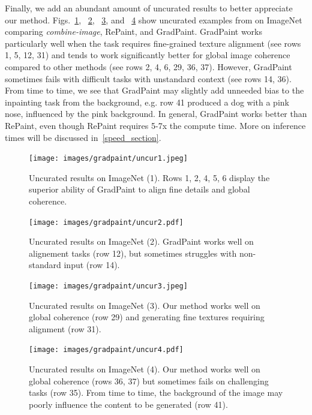 Finally, we add an abundant amount of uncurated results to better appreciate our method.
Figs.~\ref{fig:uncur1}, ~\ref{fig:uncur2}, ~\ref{fig:uncur3}, and ~\ref{fig:uncur4} show uncurated 
examples from on ImageNet comparing \emph{combine-image}, RePaint, and GradPaint. GradPaint works particularly well when the 
task requires fine-grained texture alignment (see rows 1, 5, 12, 31)  and tends to work significantly better for global image 
coherence compared to other methods (see rows 2, 4, 6, 29, 36, 37). However, GradPaint sometimes fails with difficult tasks with 
unstandard context (see rows 14, 36). From time to time, we see that GradPaint may slightly add unneeded bias to the inpainting 
task from the background, e.g. row 41 produced a dog with a pink nose, influenced by the pink background. In general, GradPaint 
works better than RePaint, even though RePaint requires 5-7x the compute time. More on inference times will be discussed  
in~\ref{speed_section}.


\begin{figure}[H]
  \centering
    \texttt{[image: images/gradpaint/uncur1.jpeg]}
    \caption{Uncurated results on ImageNet (1). Rows 1, 2, 4, 5, 6 display the superior ability of GradPaint to align fine details and global coherence.}
    \label{fig:uncur1}
\end{figure}

\begin{figure}[H]
  \centering
    \texttt{[image: images/gradpaint/uncur2.pdf]}
    \caption{Uncurated results on ImageNet (2). GradPaint works well on alignement tasks (row 12), but sometimes struggles with non-standard input (row 14). }
    \label{fig:uncur2}
\end{figure}

\begin{figure}[H]
  \centering
    \texttt{[image: images/gradpaint/uncur3.jpeg]}
    \caption{Uncurated results on ImageNet (3). Our method works well on global coherence (row 29) and generating fine textures requiring alignment (row 31).}
    \label{fig:uncur3}
\end{figure}

\begin{figure}[H]
  \centering
    \texttt{[image: images/gradpaint/uncur4.pdf]}
    \caption{Uncurated results on ImageNet (4). Our method works well on global coherence (rows 36, 37) but sometimes fails on challenging tasks (row 35). From time to time, the background of the image may poorly influence the content to be generated (row 41).}
    \label{fig:uncur4}
\end{figure}


